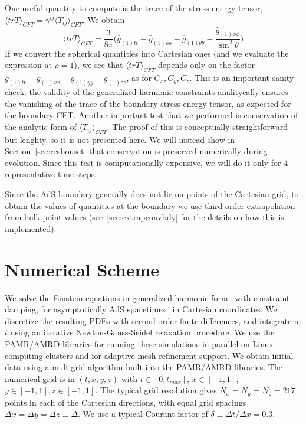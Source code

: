 \documentclass[a4paper,11pt]{article}
\begin{document}
One useful quantity to compute is the trace of the stress-energy tensor, $\langle trT\rangle_{CFT}=\gamma^{ij} \langle T_{ij}\rangle_{CFT}$. We obtain
\begin{equation}
\langle trT\rangle_{CFT}=\frac{3}{8\pi}\biggl(\bar{g}_{(1)tt}-\bar{g}_{(1)\rho\rho}-\bar{g}_{(1)\theta\theta}-\frac{\bar{g}_{(1)\phi\phi}}{\sin^2\theta}\biggr)
\end{equation}
If we convert the spherical quantities into Cartesian ones (and we evaluate the expression at $\rho=1$), we see that $\langle trT\rangle_{CFT}$ depends only on the factor $\bar{g}_{(1)tt}-\bar{g}_{(1)xx}-\bar{g}_{(1)yy}-\bar{g}_{(1)zz}$, as for $C_x,C_y,C_z$. This is an important sanity check: the validity of the generalized harmonic constraints analitycally ensures the vanishing of the trace of the boundary stress-energy tensor, as expected for the boundary CFT.
Another important test that we performed is conservation of the analytic form of $\langle T_{ij}\rangle_{CFT}$. The proof of this is conceptually straightforward but lenghty, so it is not presented here. We will instead show in Section~\ref{sec:resbouset} that conservation is preserved numerically during evolution. Since this test is computationally expensive, we will do it only for 4 representative time steps.

Since the AdS boundary generally does not lie on points of the Cartesian grid, to obtain the values of quantities at the boundary we use third order extrapolation from bulk point values (see~\ref{sec:extrapconvbdy} for the details on how this is implemented).

\section{Numerical Scheme}\label{sec:numerical_scheme}

We solve the Einstein equations in generalized harmonic form~\cite{Pretorius:2004jg} with constraint damping, for asymptotically AdS spacetimes~\cite{Bantilan:2012vu} in Cartesian coordinates.
We discretize the resulting PDEs with second order finite differences, and integrate in $t$ using an iterative Newton-Gauss-Seidel relaxation procedure. 
We use the PAMR/AMRD libraries \cite{PAMR} for running these simulations in parallel on Linux computing clusters and for adaptive mesh refinement support.
We obtain initial data using a multigrid algorithm built into the PAMR/AMRD libraries.
The numerical grid is in $(t,x,y,z)$ with $t \in [0,t_{max}]$, $x \in [-1,1]$, $y \in [-1,1], z \in [-1,1]$.
The typical grid resolution gives $N_x=N_y=N_z=217$ points in each of the Cartesian directions, with equal grid spacings $\Delta x = \Delta y = \Delta z\equiv \Delta$.
We use a typical Courant factor of $\delta \equiv \Delta t / \Delta x = 0.3$.
\end{document}
